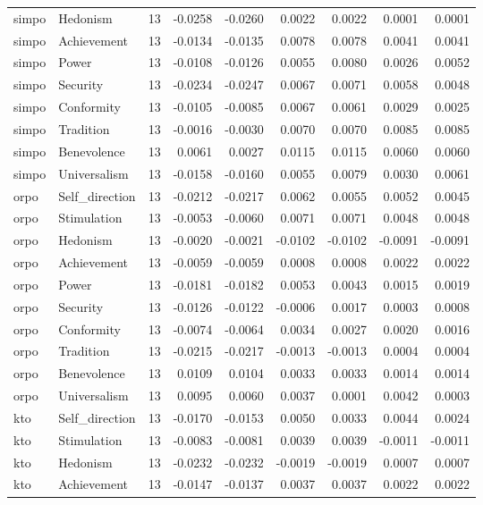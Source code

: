 \begin{tabular}{llrrrrrrr}
simpo & Hedonism & 13 & -0.0258 & -0.0260 & 0.0022 & 0.0022 & 0.0001 & 0.0001 \\
simpo & Achievement & 13 & -0.0134 & -0.0135 & 0.0078 & 0.0078 & 0.0041 & 0.0041 \\
simpo & Power & 13 & -0.0108 & -0.0126 & 0.0055 & 0.0080 & 0.0026 & 0.0052 \\
simpo & Security & 13 & -0.0234 & -0.0247 & 0.0067 & 0.0071 & 0.0058 & 0.0048 \\
simpo & Conformity & 13 & -0.0105 & -0.0085 & 0.0067 & 0.0061 & 0.0029 & 0.0025 \\
simpo & Tradition & 13 & -0.0016 & -0.0030 & 0.0070 & 0.0070 & 0.0085 & 0.0085 \\
simpo & Benevolence & 13 & 0.0061 & 0.0027 & 0.0115 & 0.0115 & 0.0060 & 0.0060 \\
simpo & Universalism & 13 & -0.0158 & -0.0160 & 0.0055 & 0.0079 & 0.0030 & 0.0061 \\
orpo & Self\_direction & 13 & -0.0212 & -0.0217 & 0.0062 & 0.0055 & 0.0052 & 0.0045 \\
orpo & Stimulation & 13 & -0.0053 & -0.0060 & 0.0071 & 0.0071 & 0.0048 & 0.0048 \\
orpo & Hedonism & 13 & -0.0020 & -0.0021 & -0.0102 & -0.0102 & -0.0091 & -0.0091 \\
orpo & Achievement & 13 & -0.0059 & -0.0059 & 0.0008 & 0.0008 & 0.0022 & 0.0022 \\
orpo & Power & 13 & -0.0181 & -0.0182 & 0.0053 & 0.0043 & 0.0015 & 0.0019 \\
orpo & Security & 13 & -0.0126 & -0.0122 & -0.0006 & 0.0017 & 0.0003 & 0.0008 \\
orpo & Conformity & 13 & -0.0074 & -0.0064 & 0.0034 & 0.0027 & 0.0020 & 0.0016 \\
orpo & Tradition & 13 & -0.0215 & -0.0217 & -0.0013 & -0.0013 & 0.0004 & 0.0004 \\
orpo & Benevolence & 13 & 0.0109 & 0.0104 & 0.0033 & 0.0033 & 0.0014 & 0.0014 \\
orpo & Universalism & 13 & 0.0095 & 0.0060 & 0.0037 & 0.0001 & 0.0042 & 0.0003 \\
kto & Self\_direction & 13 & -0.0170 & -0.0153 & 0.0050 & 0.0033 & 0.0044 & 0.0024 \\
kto & Stimulation & 13 & -0.0083 & -0.0081 & 0.0039 & 0.0039 & -0.0011 & -0.0011 \\
kto & Hedonism & 13 & -0.0232 & -0.0232 & -0.0019 & -0.0019 & 0.0007 & 0.0007 \\
kto & Achievement & 13 & -0.0147 & -0.0137 & 0.0037 & 0.0037 & 0.0022 & 0.0022 \\

\end{tabular}
